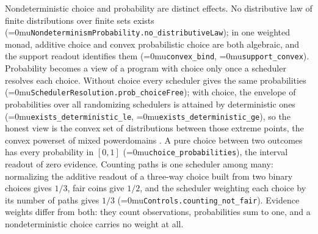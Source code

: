\documentclass[11pt]{article}
\newcommand{\leanname}[1]{\textup{\Urlmuskip=0mu\relax\nolinkurl{#1}}}
\theoremstyle{definition}
\theoremstyle{remark}
\begin{document}
Nondeterministic choice and probability are distinct effects.  No distributive
law of finite distributions over finite sets exists
\cite{VaraccaWinskelDistributing,ZwartMarsdenNoGo}
(\leanname{NondeterminismProbability.no_distributiveLaw}); in one weighted
monad, additive choice and convex probabilistic choice are both algebraic, and
the support readout identifies them
(\leanname{convex_bind}, \leanname{support_convex}).  Probability becomes a view
of a program with choice only once a scheduler resolves each choice.  Without
choice every scheduler gives the same probabilities
(\leanname{SchedulerResolution.prob_choiceFree}); with choice, the envelope of
probabilities over all randomizing schedulers is attained by deterministic
ones (\leanname{exists_deterministic_le}, \leanname{exists_deterministic_ge}),
so the honest view is the convex set of distributions between those extreme
points, the convex powerset of mixed powerdomains
\cite{KeimelPlotkinMixed}.  A pure choice between two outcomes has every
probability in $[0,1]$ (\leanname{choice_probabilities}), the interval readout
of zero evidence.  Counting paths is one scheduler among many: normalizing the
additive readout of a three-way choice built from two binary choices gives
$1/3$, fair coins give $1/2$, and the scheduler weighting each choice by its
number of paths gives $1/3$ (\leanname{Controls.counting_not_fair}).  Evidence
weights differ from both: they count observations, probabilities sum to one,
and a nondeterministic choice carries no weight at all.
\end{document}
